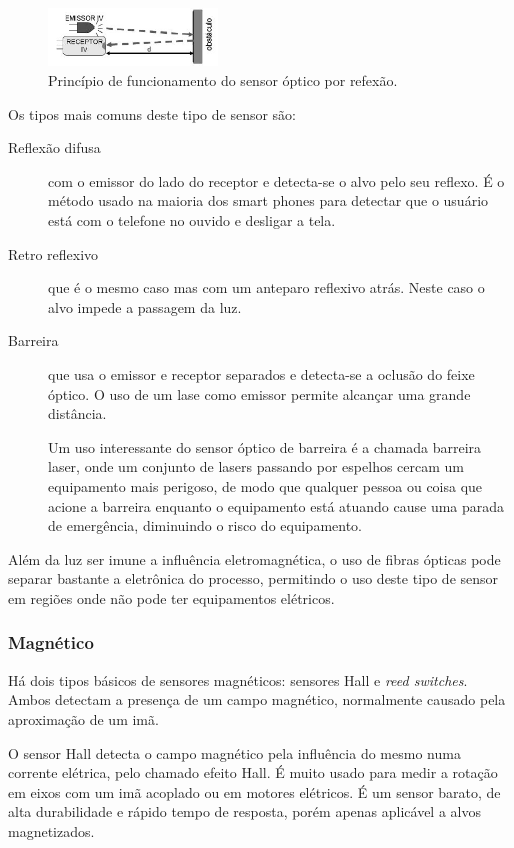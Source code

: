 \begin{figure}
  \centering
  \includegraphics[width=0.4\textwidth]{figuras/sensorOptico}
  \caption{Princípio de funcionamento do sensor óptico por refexão.}\label{fig:sensorOptico}
\end{figure}

Os tipos mais comuns deste tipo de sensor são:
\begin{description}
  \item[Reflexão difusa] com o emissor do lado do receptor e detecta-se o alvo pelo seu reflexo. É o método usado na maioria dos smart phones para detectar que o usuário está com o telefone no ouvido e desligar a tela.
  \item[Retro reflexivo] que é o mesmo caso mas com um anteparo reflexivo atrás. Neste caso o alvo impede a passagem da luz.
  \item[Barreira] que usa o emissor e receptor separados e detecta-se a oclusão do feixe óptico. O uso de um lase como emissor permite alcançar uma grande distância.

  Um uso interessante do sensor óptico de barreira é a chamada barreira laser, onde um conjunto de lasers passando por espelhos cercam um equipamento mais perigoso, de modo que qualquer pessoa ou coisa que acione a barreira enquanto o equipamento está atuando cause uma parada de emergência, diminuindo o risco do equipamento.
\end{description}

Além da luz ser imune a influência eletromagnética, o uso de fibras ópticas pode separar bastante a eletrônica do processo, permitindo o uso deste tipo de sensor em regiões onde não pode ter equipamentos elétricos.

\subsubsection{Magnético}
\label{subs:Magnetico}

Há dois tipos básicos de sensores magnéticos: sensores Hall e \emph{reed switches}. Ambos detectam a presença de um campo magnético, normalmente causado pela aproximação de um imã.

O sensor Hall detecta o campo magnético pela influência do mesmo numa corrente elétrica, pelo chamado efeito Hall. É muito usado para medir a rotação em eixos com um imã acoplado ou em motores elétricos. É um sensor barato, de alta durabilidade e rápido tempo de resposta, porém apenas aplicável a alvos magnetizados.

